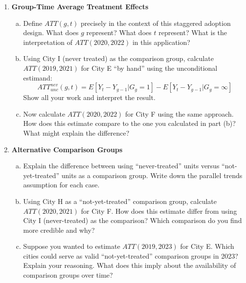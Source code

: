 \documentclass[12pt,a4paper]{article}
\begin{document}
\begin{enumerate}
\item \textbf{Group-Time Average Treatment Effects}
\begin{enumerate}[(a)]
\item Define $ATT(g, t)$ precisely in the context of this staggered adoption design. What does $g$ represent? What does $t$ represent? What is the interpretation of $ATT(2020, 2022)$ in this application?
\item Using City I (never treated) as the comparison group, calculate $ATT(2019, 2021)$ for City E ``by hand'' using the unconditional estimand:
\begin{equation*}
ATT^{nev}_{unc}(g, t) = E[Y_t - Y_{g-1}|G_g = 1] - E[Y_t - Y_{g-1}|G_g = \infty]
\end{equation*}
Show all your work and interpret the result.
\item Now calculate $ATT(2020, 2022)$ for City F using the same approach. How does this estimate compare to the one you calculated in part (b)? What might explain the difference?
\end{enumerate}

\item \textbf{Alternative Comparison Groups}
\begin{enumerate}[(a)]
\item Explain the difference between using ``never-treated'' units versus ``not-yet-treated'' units as a comparison group. Write down the parallel trends assumption for each case.
\item Using City H as a ``not-yet-treated'' comparison group, calculate $ATT(2020, 2021)$ for City F. How does this estimate differ from using City I (never-treated) as the comparison? Which comparison do you find more credible and why?
\item Suppose you wanted to estimate $ATT(2019, 2023)$ for City E. Which cities could serve as valid ``not-yet-treated'' comparison groups in 2023? Explain your reasoning. What does this imply about the availability of comparison groups over time?
\end{enumerate}


\end{enumerate}
\end{document}
